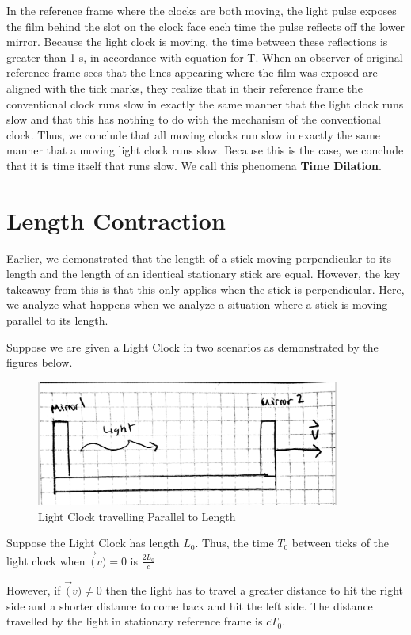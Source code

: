 \documentclass{article}
\begin{document}
In the reference frame where the clocks are both moving, the light pulse exposes the film behind the slot on the clock face each time the pulse reflects off the lower mirror. Because the light clock is moving, the time between these reflections is greater than 1 s, in accordance with equation for T. When an observer of original reference frame sees that the lines appearing where the film was exposed are aligned with the tick marks, they realize that in their reference frame the conventional clock runs slow in exactly the same manner that the light clock runs slow and that this has nothing to do with the mechanism of the conventional clock. Thus, we conclude that all moving clocks run slow in exactly the same manner that a moving light clock runs slow. Because this is the case, we conclude that it is time itself that runs slow. We call this phenomena \textbf{Time Dilation}.

\newpage
\section{Length Contraction}

Earlier, we demonstrated that the length of a stick moving perpendicular to its length and the length of an identical stationary stick are equal. However, the key takeaway from this is that this only applies when the stick is perpendicular. Here, we analyze what happens when we analyze a situation where a stick is moving parallel to its length.

Suppose we are given a Light Clock in two scenarios as demonstrated by the figures below.
\begin{figure}[!htb]
  \centering
  \includegraphics[width=100mm]{lengthcontraction1}\par
  \caption{Light Clock travelling Parallel to Length}
\end{figure}

Suppose the Light Clock has length \(L_0\). Thus, the time \(T_0\) between ticks of the light clock when \(\vec(v) = 0\) is \(\frac{2L_0}{c}\)

However, if  \(\vec(v) \neq 0\) then the light has to travel a greater distance to hit the right side and a shorter distance to come back and hit the left side. The distance travelled by the light in stationary reference frame is \(cT_0\).
\end{document}
